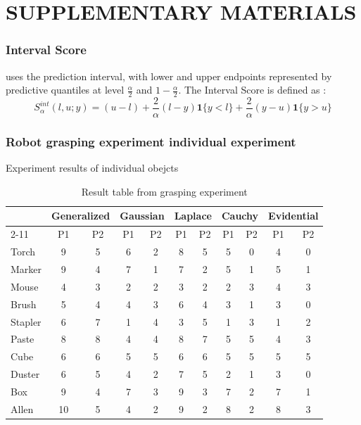 \section*{SUPPLEMENTARY MATERIALS}
\subsubsection{Interval Score} uses the prediction interval, with lower and upper endpoints represented by predictive quantiles at level $\frac{\alpha}{2}$ and $1 - \frac{\alpha}{2}$. The Interval Score is defined as :
\begin{equation}
S_\alpha^{int} (l,u;y) = (u - l) +\frac{2}{\alpha}(l-y)\mathbf{1}\{y<l\} + \frac{2}{\alpha}(y-u)\mathbf{1}\{y>u\}
\end{equation}


\subsubsection{Robot grasping experiment individual experiment }

Experiment results of individual obejcts 
\begin{table}[htbp]
	\caption{Result table from grasping experiment}
	\centering
	\begin{tabular}{|l|c|c|c|c|c|c|c|c|c|c|}
		\hline
		
		 & \multicolumn{2}{c|}{\textbf{Generalized}} & \multicolumn{2}{c|}{\textbf{Gaussian}} & \multicolumn{2}{c|}{\textbf{Laplace}} & \multicolumn{2}{c|}{\textbf{Cauchy}} & \multicolumn{2}{c|}{\textbf{Evidential}} \\ \cline{2-11} 
		
		& P1 & P2 & P1 & P2 & P1 & P2 & P1 & P2 & P1 & P2 \\ \hline
		Torch & 9 & 5 & 6 & 2 & 8 & 5 & 5 & 0 & 4 & 0 \\ \hline
		Marker & 9 & 4 & 7 & 1 & 7 & 2 & 5 & 1 & 5 & 1 \\ \hline
		Mouse & 4 & 3 & 2 & 2 & 3 & 2 & 2 & 3 & 4 & 3 \\ \hline
		Brush & 5 & 4 & 4 & 3 & 6 & 4 & 3 & 1 & 3 & 0 \\ \hline
		Stapler & 6 & 7 & 1 & 4 & 3 & 5 & 1 & 3 & 1 & 2 \\ \hline
		Paste & 8 & 8 & 4 & 4 & 8 & 7 & 5 & 5 & 4 & 3 \\ \hline
		Cube & 6 & 6 & 5 & 5 & 6 & 6 & 5 & 5 & 5 & 5 \\ \hline
		Duster & 6 & 5 & 4 & 2 & 7 & 5 & 2 & 1 & 3 & 0 \\ \hline
		Box & 9 & 4 & 7 & 3 & 9 & 3 & 7 & 2 & 7 & 1 \\ \hline
		Allen & 10 & 5 & 4 & 2 & 9 & 2 & 8 & 2 & 8 & 3 \\ \hline
		
	\end{tabular}
	
\end{table}


